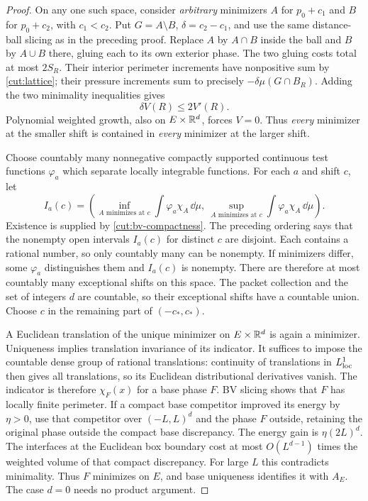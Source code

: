\begin{proof}
On any one such space, consider \emph{arbitrary} minimizers $A$ for
$p_0+c_1$ and $B$ for $p_0+c_2$, with $c_1<c_2$.  Put
$G=A\setminus B$, $\delta=c_2-c_1$, and use the same distance-ball
slicing as in the preceding proof.  Replace $A$ by $A\cap B$ inside the
ball and $B$ by $A\cup B$ there, gluing each to its own exterior phase.
The two gluing costs total at most $2S_R$.  Their interior perimeter
increments have nonpositive sum by \eqref{cut:lattice}; their pressure
increments sum to precisely $-\delta\mu(G\cap B_R)$.  Adding the two
minimality inequalities gives
\begin{equation}\label{cut:ordering-volume}
                 \delta V(R)\le2V'(R).
\end{equation}
Polynomial weighted growth, also on $E\times\mathbb R^d$, forces $V=0$.
Thus \emph{every} minimizer at the smaller shift is contained in
\emph{every} minimizer at the larger shift.

Choose countably many nonnegative compactly supported continuous test
functions $\varphi_a$ which separate locally integrable functions.
For each $a$ and shift $c$, let
\[
 I_a(c)=\left(\inf_{A\text{ minimizes at }c}
                 \int\varphi_a\chi_A\,\dd\mu,
              \ \sup_{A\text{ minimizes at }c}
                 \int\varphi_a\chi_A\,\dd\mu\right).
\]
Existence is supplied by \cref{cut:bv-compactness}.  The preceding
ordering says that the nonempty open intervals $I_a(c)$ for distinct
$c$ are disjoint.  Each contains a rational number, so only countably
many can be nonempty.  If minimizers differ, some $\varphi_a$ distinguishes
them and $I_a(c)$ is nonempty.  There are therefore at most countably
many exceptional shifts on this space.  The packet collection and the
set of integers $d$ are countable, so their exceptional shifts have a
countable union.  Choose $c$ in the remaining part of $(-c_*,c_*)$.

A Euclidean translation of the unique minimizer on $E\times\mathbb R^d$ is
again a minimizer.  Uniqueness implies translation invariance of its
indicator.  It suffices to impose the countable dense group of rational
translations: continuity of translations in $L^1_{\rm loc}$ then gives
all translations, so its Euclidean distributional derivatives vanish.
The indicator is therefore $\chi_F(x)$ for a base phase $F$.
BV slicing shows that $F$ has locally finite perimeter.  If a compact
base competitor improved its energy by $\eta>0$, use that competitor
over $(-L,L)^d$ and the phase $F$ outside, retaining the original phase
outside the compact base discrepancy.  The energy gain is
$\eta(2L)^d$.  The interfaces at the Euclidean box boundary cost at most
$O(L^{d-1})$ times the weighted volume of that compact discrepancy.
For large $L$ this contradicts minimality.  Thus $F$ minimizes on $E$,
and base uniqueness identifies it with $A_E$.  The case $d=0$ needs
no product argument.
\end{proof}

